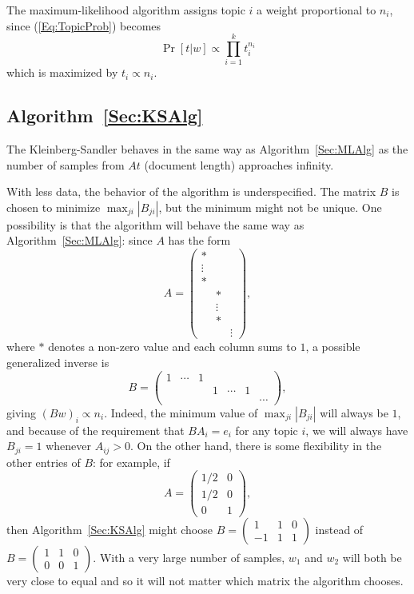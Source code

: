\documentclass{article}
\begin{document}
The maximum-likelihood algorithm assigns topic \(i\) a weight proportional to \(n_i\), since (\ref{Eq:TopicProb}) becomes
\[ \Pr[t | w] \propto \prod_{i=1}^k t_i^{n_i} \]
which is maximized by \(t_i \propto n_i\).

\subsection{Algorithm~\ref{Sec:KSAlg}}

The Kleinberg-Sandler behaves in the same way as Algorithm~\ref{Sec:MLAlg} as the number of samples from \(A t\)  (document length) approaches infinity.

With less data, the behavior of the algorithm is underspecified.
The matrix \(B\) is chosen to minimize \(\max_{ji} |B_{ji}|\), but the minimum might not be unique.
One possibility is that the algorithm will behave the same way as Algorithm~\ref{Sec:MLAlg}: since \(A\) has the form
\[
    A =
    \begin{pmatrix}
        *      &        &
    \\  \vdots &        &
    \\  *      &        &
    \\         & *      &
    \\         & \vdots &
    \\         & *      &
    \\         &        & \vdots
    \end{pmatrix}
    ,
\]
    where \(*\) denotes a non-zero value and each column sums to \(1\), a possible generalized inverse is
\[
    B =
    \begin{pmatrix}
        1 & \cdots & 1 &   &        &   &
    \\    &        &   & 1 & \cdots & 1 &
    \\    &        &   &   &        &   & \cdots
    \end{pmatrix}
    ,
\]
    giving \((B w)_i \propto n_i\).
Indeed, the minimum value of \(\max_{ji} |B_{ji}|\) will always be \(1\), and because of the requirement that \(B A_i = e_i\) for any topic \(i\), we will always have \(B_{ji} = 1\) whenever \(A_{ij} > 0\).
On the other hand, there is some flexibility in the other entries of \(B\): for example, if
\[
    A =
    \begin{pmatrix}
        1/2 & 0
    \\  1/2 & 0
    \\  0   & 1
    \end{pmatrix}
    ,
\]
    then Algorithm~\ref{Sec:KSAlg} might choose
\(
    B =
    \begin{pmatrix}
         1 & 1 & 0
    \\  -1 & 1 & 1
    \end{pmatrix}
\)
instead of
\(
    B =
    \begin{pmatrix}
        1 & 1 & 0
    \\  0 & 0 & 1
    \end{pmatrix}
\).
With a very large number of samples, \(w_1\) and \(w_2\) will both be very close to equal and so it will not matter which matrix the algorithm chooses.
\end{document}
